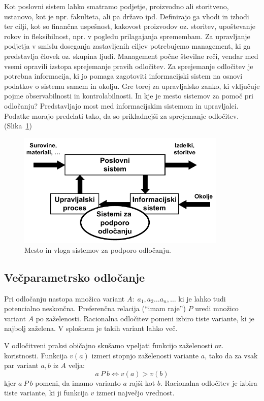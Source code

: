 Kot poslovni sistem lahko smatramo podjetje, proizvodno ali storitveno, ustanovo, kot je npr. fakulteta, ali pa državo ipd. Definirajo ga vhodi in izhodi ter cilji, kot so finančna uspešnost, kakovost proizvodov oz. storitev, upoštevanje rokov in fleksibilnost, npr. v pogledu prilagajanja spremembam. Za upravljanje podjetja v smislu doseganja zastavljenih ciljev potrebujemo management, ki ga predstavlja človek oz. skupina ljudi. Management počne številne reči, vendar med vsemi opravili izstopa sprejemanje pravih odločitev. Za sprejemanje odločitev je potrebna informacija, ki jo pomaga zagotoviti informacijski sistem na osnovi podatkov o sistemu samem in okolju. Gre torej za upravljalsko zanko, ki vključuje pojme observabilnosti in kontrolabilnosti. In kje je mesto sistemov za pomoč pri odločanju? Predstavljajo most med informacijskim sistemom in upravljalci.  Podatke morajo predelati tako, da so prikladnejši za sprejemanje odločitev. (Slika~\ref{f-vloga-dss})

\begin{figure}[htbp]
\begin{center}
\includegraphics[width=10cm]{slike/vloga-dss.pdf}
\caption{Mesto in vloga sistemov za podporo odločanju.}
\label{f-vloga-dss}
\end{center}
\end{figure}

\subsection{Večparametrsko odločanje}

Pri odločanju nastopa množica variant $A:\; a_1, a_2\ldots a_n, \ldots$ ki je lahko tudi potencialno neskončna. Preferenčna relacija (``imam raje'') $P$ uredi množico variant $A$ po zaželenosti. Racionalna odločitev pomeni izbiro tiste variante, ki je najbolj zaželena. V splošnem je takih variant lahko več.

V odločitveni praksi običajno skušamo vpeljati funkcijo zaželenosti oz. koristnosti. Funkcija $v(a)$ izmeri stopnjo zaželenosti variante $a$, tako da za vsak par variant $a,b$ iz $A$ velja:
%
$$ a\ P\ b \Leftrightarrow v(a) > v(b) $$
%
kjer $ a\ P\ b$ pomeni, da imamo varianto $a$ rajši kot $b$. Racionalna odločitev je izbira tiste variante, ki ji funkcija $v$ izmeri največjo vrednost.

